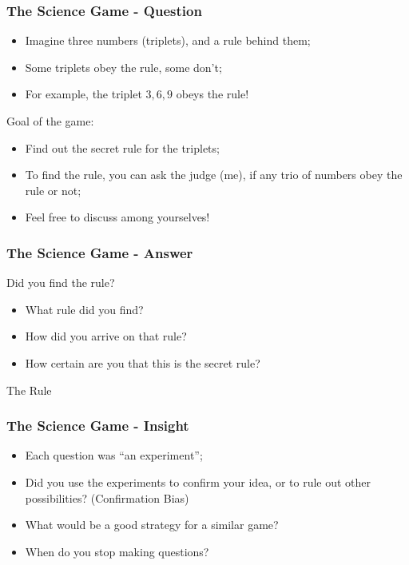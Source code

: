 \documentclass{beamer}
\begin{document}
\begin{frame}
  \frametitle{The Science Game - Question}
  \begin{block}{}
    \begin{itemize}
    \item Imagine three numbers (triplets), and a rule behind them;
    \item Some triplets obey the rule, some don't;
    \item For example, the triplet ${3,6,9}$ obeys the rule!
    \end{itemize}
  \end{block}
  
  \begin{block}{Goal of the game:}
    \begin{itemize}
    \item Find out the secret rule for the triplets;
    \item To find the rule, you can ask the judge (me), if any trio of
      numbers obey the rule or not;
    \item Feel free to discuss among yourselves!
    \end{itemize}
  \end{block}
\end{frame}

\begin{frame}
  \frametitle{The Science Game - Answer}

  Did you find the rule?
  \begin{itemize}
    \item What rule did you find?
    \item How did you arrive on that rule?
    \item How certain are you that this is the secret rule?
  \end{itemize}
  \bigskip

  \begin{block}{The Rule}
  \end{block}
\end{frame}

\begin{frame}
  \frametitle{The Science Game - Insight}
  \begin{itemize}
  \item Each question was ``an experiment'';
  \item Did you use the experiments to confirm your idea, or to rule
    out other possibilities? (Confirmation Bias)
  \item What would be a good strategy for a similar game?
  \item When do you stop making questions?
  \end{itemize}
\end{frame}
\end{document}
